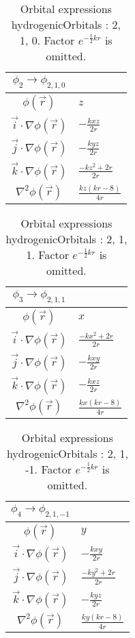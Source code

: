 \begin{table}
\begin{center}
\begin{tabular}{c|l}
$\phi_{2} \rightarrow \phi_{2, 1, 0}$\\
\hline
$\phi(\vec r)$ & $z$\\
\hline
$\vec i\cdot \nabla \phi(\vec r)$ & $- \frac{k x z}{2 r}$\\
$\vec j\cdot \nabla \phi(\vec r)$ & $- \frac{k y z}{2 r}$\\
$\vec k\cdot \nabla \phi(\vec r)$ & $\frac{- k z^{2} + 2 r}{2 r}$\\
\hline
$\nabla^2 \phi(\vec r)$ & $\frac{k z \left(k r -8\right)}{4 r}$\\
\end{tabular}
\caption{Orbital expressions hydrogenicOrbitals : 2, 1, 0. Factor $e^{- \frac{1}{2} k r}$ is omitted.}
\end{center}
\end{table}


\begin{table}
\begin{center}
\begin{tabular}{c|l}
$\phi_{3} \rightarrow \phi_{2, 1, 1}$\\
\hline
$\phi(\vec r)$ & $x$\\
\hline
$\vec i\cdot \nabla \phi(\vec r)$ & $\frac{- k x^{2} + 2 r}{2 r}$\\
$\vec j\cdot \nabla \phi(\vec r)$ & $- \frac{k x y}{2 r}$\\
$\vec k\cdot \nabla \phi(\vec r)$ & $- \frac{k x z}{2 r}$\\
\hline
$\nabla^2 \phi(\vec r)$ & $\frac{k x \left(k r -8\right)}{4 r}$\\
\end{tabular}
\caption{Orbital expressions hydrogenicOrbitals : 2, 1, 1. Factor $e^{- \frac{1}{2} k r}$ is omitted.}
\end{center}
\end{table}

\clearpage

\begin{table}
\begin{center}
\begin{tabular}{c|l}
$\phi_{4} \rightarrow \phi_{2, 1, -1}$\\
\hline
$\phi(\vec r)$ & $y$\\
\hline
$\vec i\cdot \nabla \phi(\vec r)$ & $- \frac{k x y}{2 r}$\\
$\vec j\cdot \nabla \phi(\vec r)$ & $\frac{- k y^{2} + 2 r}{2 r}$\\
$\vec k\cdot \nabla \phi(\vec r)$ & $- \frac{k y z}{2 r}$\\
\hline
$\nabla^2 \phi(\vec r)$ & $\frac{k y \left(k r -8\right)}{4 r}$\\
\end{tabular}
\caption{Orbital expressions hydrogenicOrbitals : 2, 1, -1. Factor $e^{- \frac{1}{2} k r}$ is omitted.}
\end{center}
\end{table}


